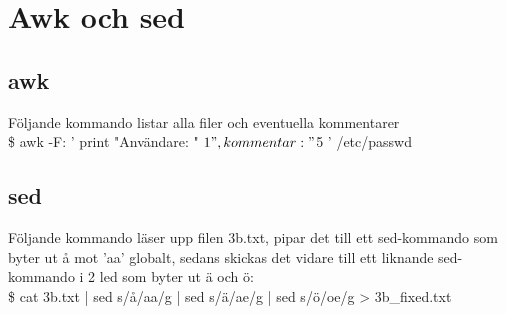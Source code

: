 \documentclass[11pt]{article}
\begin{document}
\subsection{ }

\section{ Awk och sed}
\subsection{awk}Följande kommando listar alla filer och eventuella kommentarer\\
\$ awk -F: '{ print "Användare: " $1 ", kommentar: " $5  }' /etc/passwd

\subsection{sed}
Följande kommando läser upp filen 3b.txt, pipar det till ett sed-kommando som byter ut å mot 'aa' globalt, sedans skickas det vidare till ett liknande sed-kommando i 2 led som byter ut ä och ö:\\
\$ cat 3b.txt | sed s/å/aa/g | sed s/ä/ae/g | sed s/ö/oe/g > 3b\_fixed.txt
\end{document}

